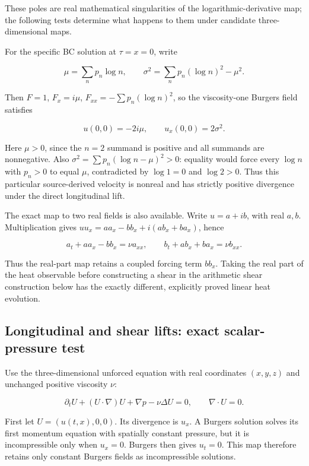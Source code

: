 These poles are real mathematical singularities of the logarithmic-derivative map; the following tests determine what happens to them under candidate three-dimensional maps.

For the specific BC solution at \(\tau=x=0\), write

\[
\mu=\sum_np_n\log n,\qquad
\sigma^2=\sum_np_n(\log n)^2-\mu^2.
\]

Then \(F=1\), \(F_x=i \mu\), \(F_{xx}=-\sum p_n(\log n)^2\), so the viscosity-one Burgers field satisfies

\[
u(0,0)=-2i\mu,\qquad u_x(0,0)=2\sigma^2.
\]

Here \(\mu>0\), since the \(n=2\) summand is positive and all summands are nonnegative. Also \(\sigma^2=\sum p_n(\log n-\mu)^2>0\): equality would force every \(\log n\) with \(p_n>0\) to equal \(\mu\), contradicted by \(\log 1=0\) and \(\log 2>0\). Thus this particular source-derived velocity is nonreal and has strictly positive divergence under the direct longitudinal lift.

The exact map to two real fields is also available. Write \(u=a+ib\), with real \(a,b\). Multiplication gives \(uu_x=aa_x-bb_x+i(ab_x+ba_x)\), hence

\[
a_t+aa_x-bb_x=\nu a_{xx},\qquad
b_t+ab_x+ba_x=\nu b_{xx}.
\]

Thus the real-part map retains a coupled forcing term \(bb_x\). Taking the real part of the heat observable before constructing a shear in the arithmetic shear construction below has the exactly different, explicitly proved linear heat evolution.

\subsection{Longitudinal and shear lifts: exact scalar-pressure test}\label{longitudinal-and-shear-lifts-exact-scalar-pressure-test}

Use the three-dimensional unforced equation with real coordinates \((x,y,z)\) and unchanged positive viscosity \(\nu\):

\[
\partial_tU+(U\cdot\nabla)U+\nabla p-\nu\Delta U=0,
\qquad\nabla\cdot U=0.
\]

First let \(U=(u(t,x),0,0)\). Its divergence is \(u_x\). A Burgers solution solves its first momentum equation with spatially constant pressure, but it is incompressible only when \(u_x=0\). Burgers then gives \(u_t=0\). This map therefore retains only constant Burgers fields as incompressible solutions.

